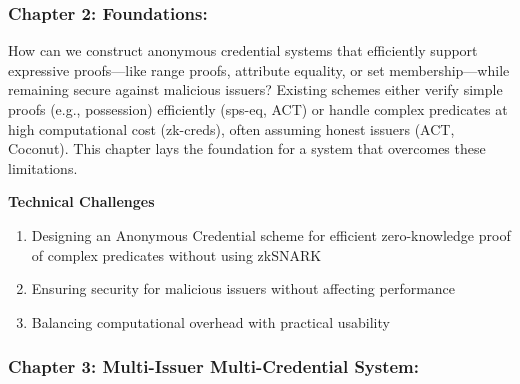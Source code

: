 \subsubsection*{Chapter 2: Foundations: } 



How can we construct anonymous credential systems that efficiently support expressive proofs—like range proofs, attribute equality, or set membership—while remaining secure against malicious issuers? Existing schemes either verify simple proofs (e.g., possession) efficiently (sps-eq, ACT) or handle complex predicates at high computational cost (zk-creds), often assuming honest issuers (ACT, Coconut). This chapter lays the foundation for a system that overcomes these limitations.

\noindent \textbf{Technical Challenges}
\begin{enumerate}
    \item Designing an Anonymous Credential scheme for efficient zero-knowledge proof of complex predicates without using zkSNARK
    \item Ensuring security for malicious issuers without affecting performance
    \item Balancing computational overhead with practical usability
\end{enumerate}

\subsubsection*{Chapter 3: Multi-Issuer Multi-Credential System: } 


